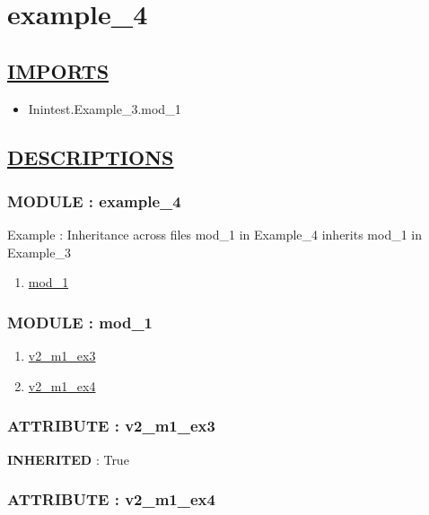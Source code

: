 \chapter*{example\_4}

\section*{\underline{IMPORTS}}
\begin{itemize}
\item Inintest.Example\_3.mod\_1
\end{itemize}

\section*{\underline{DESCRIPTIONS}}
\subsection*{MODULE : example\_4}
\hypertarget{ecldoc:example_4_example_4}{}
Example : Inheritance across files mod\_1 in Example\_4 inherits mod\_1 in Example\_3 \\
\begin{enumerate}
\item \hyperlink{ecldoc:example_4_example_4.mod_1}{mod\_1}
\end{enumerate}
\subsection*{MODULE : mod\_1}
\hypertarget{ecldoc:example_4_example_4.mod_1}{}
\begin{enumerate}
\item \hyperlink{ecldoc:example_4_inintest.example_3.mod_1.v2_m1_ex3}{v2\_m1\_ex3}
\item \hyperlink{ecldoc:example_4_example_4.mod_1.v2_m1_ex4}{v2\_m1\_ex4}
\end{enumerate}
\subsection*{ATTRIBUTE : v2\_m1\_ex3}
\hypertarget{ecldoc:example_4_inintest.example_3.mod_1.v2_m1_ex3}{}
\textbf{INHERITED} : True \\
\subsection*{ATTRIBUTE : v2\_m1\_ex4}
\hypertarget{ecldoc:example_4_example_4.mod_1.v2_m1_ex4}{}


